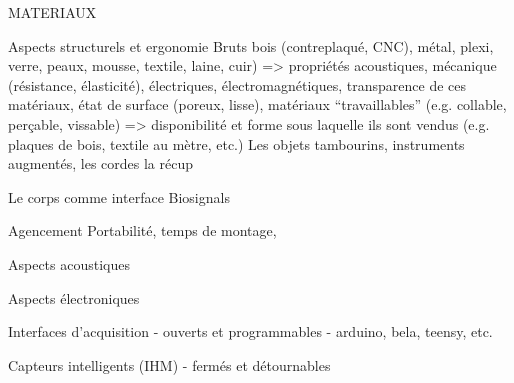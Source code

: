 MATERIAUX

Aspects structurels et ergonomie
	Bruts
		bois (contreplaqué, CNC), métal, plexi, verre, peaux, mousse, textile, laine, cuir)
		=> propriétés acoustiques, mécanique (résistance, élasticité), électriques, électromagnétiques, transparence de ces matériaux, état de surface (poreux, lisse), matériaux ``travaillables'' (e.g. collable, perçable, vissable)
		=> disponibilité et forme sous laquelle ils sont vendus (e.g. plaques de bois, textile au mètre, etc.)
	Les objets
		tambourins, instruments augmentés, les cordes
		la récup

	Le corps comme interface
		Biosignals

	Agencement
		Portabilité, temps de montage, 

Aspects acoustiques



Aspects électroniques


Interfaces d'acquisition
- ouverts et programmables
	- arduino, bela, teensy, etc.


Capteurs intelligents (IHM)
- fermés et détournables

